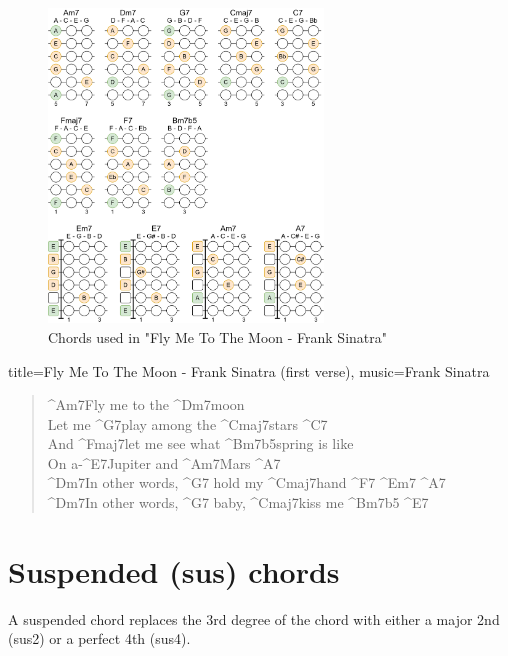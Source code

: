\begin{figure}[h]
	\centering
	\includegraphics[width=0.65\textwidth]{../../Images/ChordsInFlyMeToTheMoonFrankSinatra.png}
	\caption{Chords used in "Fly Me To The Moon - Frank Sinatra"}
	\label{fig:guitar_chords_fly_me_to_the_moon_frank_sinatra}
\end{figure}

\begin{song}[align-chords=l]{title={Fly Me To The Moon - Frank Sinatra (first verse)}, music={Frank Sinatra}}
	\begin{verse}
		^{Am7}Fly me to the ^{Dm7}moon \\
		Let me ^{G7}play among the ^{Cmaj7}stars ^{C7}  \\
		And ^{Fmaj7}let me see what ^{Bm7b5}spring is like \\
		On a-^{E7}Jupiter and ^{Am7}Mars ^{A7}  \\
		^{Dm7}In other words, ^{G7} hold my ^{Cmaj7}hand ^{F7} ^{Em7} ^{A7}  \\
		^{Dm7}In other words, ^{G7} baby, ^{Cmaj7}kiss me ^{Bm7b5} ^{E7} \\
	\end{verse}
\end{song}

\newpage

\section{Suspended (sus) chords}

A suspended chord replaces the 3rd degree of the chord with either a major 2nd (sus2) or a perfect 4th (sus4).

